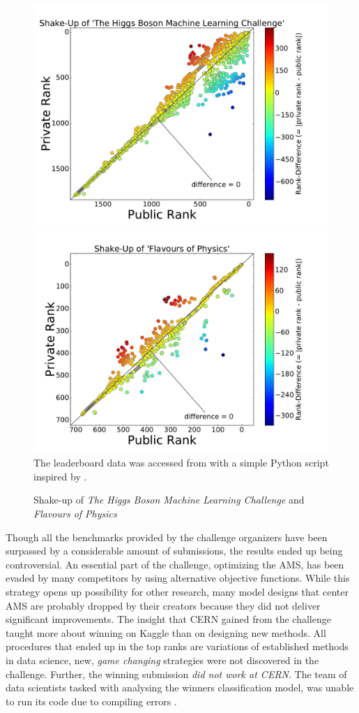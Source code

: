 \begin{figure}
\begin{center}
	\includegraphics[trim=15 0 40 0,clip,width=.47\textwidth]{images/shakeup1.pdf}
	\quad
	\includegraphics[trim=15 0 40 0,clip,width=.47\textwidth]{images/shakeup2.pdf}
	The leaderboard data was accessed from \cite{kaggle} with a simple Python script inspired by \cite{hebert}.
	\caption{Shake-up of \emph{The Higgs Boson Machine Learning Challenge} and \emph{Flavours of Physics}}
	\label{fig:shakeup}
\end{center}
\end{figure}

Though all the benchmarks provided by the challenge organizers have been surpassed by a considerable amount of submissions, the results ended up being controversial. An essential part of the challenge, optimizing the AMS, has been evaded by many competitors by using alternative objective functions. While this strategy opens up possibility for other research, many model designs that center AMS are probably dropped by their creators because they did not deliver significant improvements. 
The insight that CERN gained from the challenge taught more about winning on Kaggle than on designing new methods. All procedures that ended up in the top ranks are variations of established methods in data science, new, \emph{game changing} strategies were not discovered in the challenge. Further, the winning submission \emph{did not work at CERN}. The team of data scientists tasked with analysing the winners classification model, was unable to run its code due to compiling errors \cite{keglblog}.

